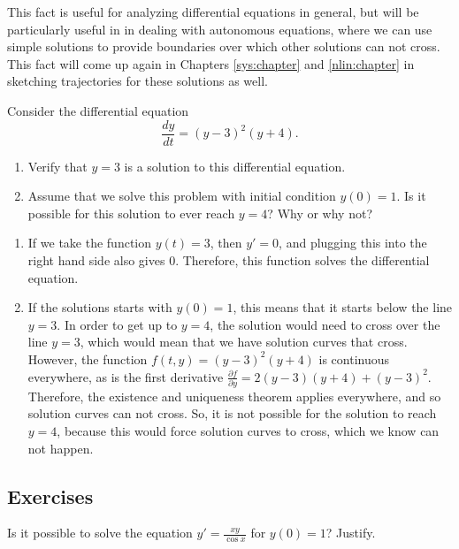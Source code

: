 This fact is useful for analyzing differential equations in general, but will be particularly useful in  in dealing with autonomous equations, where we can use simple solutions to provide boundaries over which other solutions can not cross. This fact will come up again in Chapters \ref{sys:chapter} and \ref{nlin:chapter} in sketching trajectories for these solutions as well. 

\begin{example}
Consider the differential equation 
\begin{equation*}
\frac{dy}{dt} = (y-3)^2(y+4).
\end{equation*}
\begin{enumerate}
\item Verify that $y=3$ is a solution to this differential equation.
\item Assume that we solve this problem with initial condition $y(0) = 1$. Is it possible for this solution to ever reach $y=4$? Why or why not?
\end{enumerate}
\end{example}

\begin{exampleSol}
\begin{enumerate}
\item If we take the function $y(t) = 3$, then $y' = 0$, and plugging this into the right hand side also gives $0$. Therefore, this function solves the differential equation.
\item If the solutions starts with $y(0) = 1$, this means that it starts below the line $y=3$. In order to get up to $y=4$, the solution would need to cross over the line $y=3$, which would mean that we have solution curves that cross. However, the function $f(t,y) = (y-3)^2(y+4)$ is continuous everywhere, as is the first derivative $\frac{\partial f}{\partial y} = 2(y-3)(y+4) + (y-3)^2.$ Therefore, the existence and uniqueness theorem applies everywhere, and so solution curves can not cross. So, it is not possible for the solution to reach $y=4$, because this would force solution curves to cross, which we know can not happen. 
\end{enumerate}
\end{exampleSol}

\subsection{Exercises}

\begin{exercise}
Is it possible to solve the equation $y' = \frac{xy}{\cos x}$ for $y(0) = 1$?
Justify.
\end{exercise}

